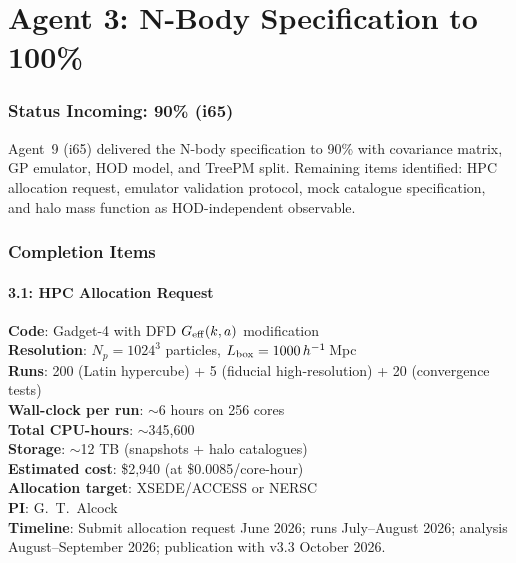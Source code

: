 \documentclass[11pt,a4paper]{article}
\begin{document}
\part{Agent 3: N-Body Specification to 100\%}
\label{part:nbody}

\section{Status Incoming: 90\% (i65)}

Agent~9 (i65) delivered the N-body specification to 90\% with covariance matrix, GP emulator, HOD model, and TreePM split. Remaining items identified: HPC allocation request, emulator validation protocol, mock catalogue specification, and halo mass function as HOD-independent observable.

\section{Completion Items}

\subsection{3.1: HPC Allocation Request}

\begin{tcolorbox}[colback=blue!5!white, colframe=blue!60!black, title={HPC Resource Request: DFD N-Body Suite}]
\textbf{Code}: Gadget-4 with DFD $G_{\rm eff}(k,a)$ modification\\
\textbf{Resolution}: $N_p = 1024^3$ particles, $L_{\rm box} = 1000\,h^{-1}$\,Mpc\\
\textbf{Runs}: 200 (Latin hypercube) + 5 (fiducial high-resolution) + 20 (convergence tests)\\
\textbf{Wall-clock per run}: $\sim$6 hours on 256 cores\\
\textbf{Total CPU-hours}: $\sim$345,600\\
\textbf{Storage}: $\sim$12 TB (snapshots + halo catalogues)\\
\textbf{Estimated cost}: \$2,940 (at \$0.0085/core-hour)\\
\textbf{Allocation target}: XSEDE/ACCESS or NERSC\\
\textbf{PI}: G.\ T.\ Alcock\\
\textbf{Timeline}: Submit allocation request June 2026; runs July--August 2026; analysis August--September 2026; publication with v3.3 October 2026.
\end{tcolorbox}
\end{document}
